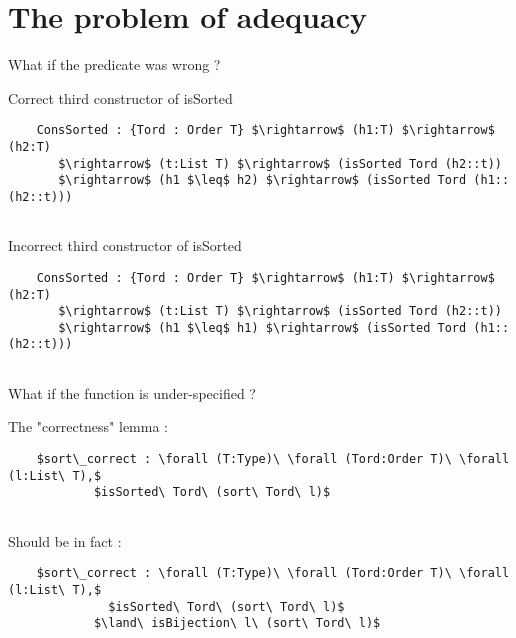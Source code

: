 \documentclass[french]{beamer}
\begin{document}
\section{The problem of adequacy}
\begin{frame}[fragile]{What if the predicate was wrong ?}

\begin{block}{Correct third constructor of isSorted}

	\begin{lstlisting}
    ConsSorted : {Tord : Order T} $\rightarrow$ (h1:T) $\rightarrow$ (h2:T) 
       $\rightarrow$ (t:List T) $\rightarrow$ (isSorted Tord (h2::t)) 
       $\rightarrow$ (h1 $\leq$ h2) $\rightarrow$ (isSorted Tord (h1::(h2::t))) 
      
	\end{lstlisting}
	
\end{block}


\begin{alertblock}{Incorrect third constructor of isSorted}

	\begin{lstlisting}
    ConsSorted : {Tord : Order T} $\rightarrow$ (h1:T) $\rightarrow$ (h2:T) 
       $\rightarrow$ (t:List T) $\rightarrow$ (isSorted Tord (h2::t)) 
       $\rightarrow$ (h1 $\leq$ h1) $\rightarrow$ (isSorted Tord (h1::(h2::t))) 
      
	\end{lstlisting}
	
\end{alertblock}

\end{frame}



\begin{frame}[fragile]{What if the function is under-specified ?}

The "correctness" lemma :

	\begin{lstlisting}
	$sort\_correct : \forall (T:Type)\ \forall (Tord:Order T)\ \forall (l:List\ T),$
            $isSorted\ Tord\ (sort\ Tord\ l)$
      
	\end{lstlisting}
	
Should be in fact :
	
	\begin{lstlisting}
	$sort\_correct : \forall (T:Type)\ \forall (Tord:Order T)\ \forall (l:List\ T),$
              $isSorted\ Tord\ (sort\ Tord\ l)$
            $\land\ isBijection\ l\ (sort\ Tord\ l)$
      
	\end{lstlisting}


\end{frame}
\end{document}
